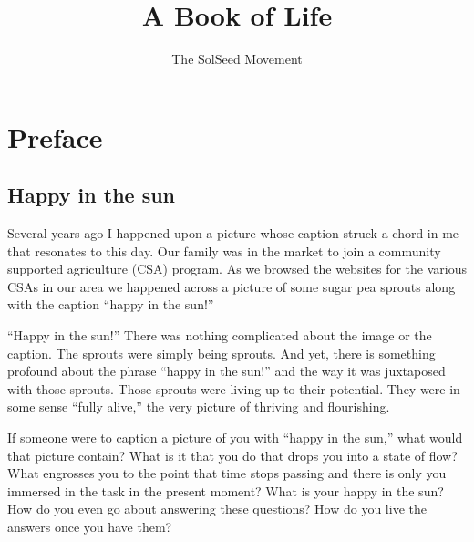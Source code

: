 \documentclass[ebook,11pt,openany,twoside,showtrims]{memoir}
\newcommand{\imagefacingchapter}[1]{
  \cleartoverso
  \clearpage \null
  \thispagestyle{cleared}
  \AddToShipoutPictureBG*{%
    \AtStockLowerLeft{%
      \texttt{[image: \#1]}
    }
  }
  \clearpage
}
\begin{document}
\title{\textbf{A Book of Life}}
\author{The SolSeed Movement}
\begin{titlingpage}
\maketitle
\end{titlingpage}




\imagefacingchapter{images/sprout-is-happy-in-the-sun}
\chapter*{Preface}
\pagestyle{plain}

\section*{Happy in the sun}

Several years ago I happened upon a picture whose caption struck a chord in me
that resonates to this day. Our family was in the market to join a community
supported agriculture (CSA) program. As we browsed the websites for the various
CSAs in our area we happened across a picture of some sugar pea sprouts along
with the caption ``happy in the sun!''

``Happy in the sun!'' There was nothing complicated about the image or the
caption. The sprouts were simply being sprouts. And yet, there is something
profound about the phrase ``happy in the sun!'' and the way it was juxtaposed
with those sprouts. Those sprouts were living up to their potential. They were
in some sense ``fully alive,'' the very picture of thriving and flourishing.

If someone were to caption a picture of you with ``happy in the sun,'' what
would that picture contain? What is it that you do that drops you into a state
of flow? What engrosses you to the point that time stops passing and there is
only you immersed in the task in the present moment? What is your happy in the
sun? How do you even go about answering these questions? How do you live the
answers once you have them?
\end{document}
